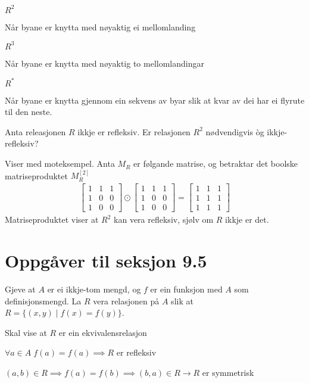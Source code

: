 \documentclass[a4paper, 11pt]{article}
\newcommand{\Themecolor}{Mahogany} %
\newcommand{\Themetext}[1]{\textcolor{\Themecolor}{#1}}
\newcommand{\Task}[1]{\vspace{3mm}\noindent {\tt \Themetext{#1:}}}
\newcommand{\MajorTask}[1]{
  \vspace{5mm}
  \reversemarginpar
  \marginnote{\large\bfseries \Themetext{#1}}
}
\begin{document}
\Task{a} $R^2$

\noindent Når byane er knytta med nøyaktig ei mellomlanding


\Task{a} $R^3$

\noindent Når byane er knytta med nøyaktig to mellomlandingar


\Task{a} $R^*$

\noindent Når byane er knytta gjennom ein sekvens av byar slik at kvar av dei
har ei flyrute til den neste.


\MajorTask{24}
\noindent Anta releasjonen \(R\) ikkje er refleksiv. Er relasjonen \(R^2\)
nødvendigvis òg ikkje-refleksiv?

\vspace{2mm}\noindent
Viser med moteksempel. Anta \(M_R\) er følgande matrise, og betraktar det boolske
matriseproduktet \(M_R^{[2]}\)
\begin{align*}
  \begin{bmatrix}
    1 & 1 & 1 \\
    1 & 0 & 0 \\
    1 & 0 & 0
  \end{bmatrix}
  \odot \begin{bmatrix}
    1 & 1 & 1 \\
    1 & 0 & 0 \\
    1 & 0 & 0
  \end{bmatrix}
  = \begin{bmatrix}
    1 & 1 & 1 \\
    1 & 1 & 1 \\
    1 & 1 & 1
  \end{bmatrix}
\end{align*}
Matriseproduktet viser at \(R^2\) kan vera refleksiv, sjølv om \(R\) ikkje er det.


\newpage
\section*{Oppgåver til seksjon 9.5}
\MajorTask{9}
\noindent Gjeve at \(A\) er ei ikkje-tom mengd, og \(f\) er ein funksjon med
\(A\) som definisjonsmengd. La \(R\) vera relasjonen på \(A\) slik at
\(R = \{(x,y) \mid f(x) = f(y)\}\).

\Task{a} Skal vise at \(R\) er ein ekvivalensrelasjon

 \(\forall a \in A\; f(a) = f(a) \implies R\) er refleksiv

 \((a,b) \in R \implies f(a) = f(b) \implies (b,a) \in R
\rightarrow R\) er symmetrisk
\end{document}
